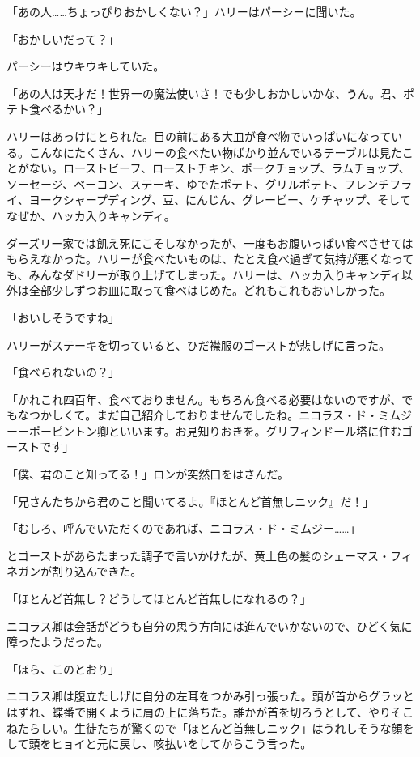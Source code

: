 \documentclass[10pt,a4paper]{article}
\begin{document}
\begin{CJK}{UTF8}{min}
「あの人……ちょっぴりおかしくない？」ハリーはパーシーに聞いた。

「おかしいだって？」

パーシーはウキウキしていた。

「あの人は天才だ！世界一の魔法使いさ！でも少しおかしいかな、うん。君、ポテト食べるかい？」

ハリーはあっけにとられた。目の前にある大皿が食べ物でいっぱいになっている。こんなにたくさん、ハリーの食べたい物ばかり並んでいるテーブルは見たことがない。ローストビーフ、ローストチキン、ポークチョップ、ラムチョップ、ソーセージ、ベーコン、ステーキ、ゆでたポテト、グリルポテト、フレンチフライ、ヨークシャープディング、豆、にんじん、グレービー、ケチャップ、そしてなぜか、ハッカ入りキャンディ。

ダーズリー家では飢え死にこそしなかったが、一度もお腹いっぱい食べさせてはもらえなかった。ハリーが食べたいものは、たとえ食べ過ぎて気持が悪くなっても、みんなダドリーが取り上げてしまった。ハリーは、ハッカ入りキャンディ以外は全部少しずつお皿に取って食べはじめた。どれもこれもおいしかった。

「おいしそうですね」

ハリーがステーキを切っていると、ひだ襟服のゴーストが悲しげに言った。

「食べられないの？」

「かれこれ四百年、食べておりません。もちろん食べる必要はないのですが、でもなつかしくて。まだ自己紹介しておりませんでしたね。ニコラス・ド・ミムジーーポーピントン卿といいます。お見知りおきを。グリフィンドール塔に住むゴーストです」

「僕、君のこと知ってる！」ロンが突然口をはさんだ。

「兄さんたちから君のこと聞いてるよ。『ほとんど首無しニック』だ！」

「むしろ、呼んでいただくのであれば、ニコラス・ド・ミムジー……」

とゴーストがあらたまった調子で言いかけたが、黄土色の髪のシェーマス・フィネガンが割り込んできた。

「ほとんど首無し？どうしてほとんど首無しになれるの？」

ニコラス卿は会話がどうも自分の思う方向には進んでいかないので、ひどく気に障ったようだった。

「ほら、このとおり」

ニコラス卿は腹立たしげに自分の左耳をつかみ引っ張った。頭が首からグラッとはずれ、蝶番で開くように肩の上に落ちた。誰かが首を切ろうとして、やりそこねたらしい。生徒たちが驚くので「ほとんど首無しニック」はうれしそうな顔をして頭をヒョイと元に戻し、咳払いをしてからこう言った。


\end{CJK}
\end{document}
